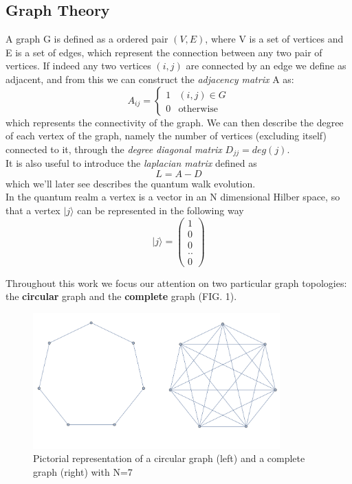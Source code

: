 \documentclass[aps,pra,reprint, onecolumn]{revtex4-2}
\begin{document}
\subsection{Graph Theory}
A graph G is defined as a ordered pair $(V,E)$, where V is a set of vertices and E is a set of edges, which represent the connection between any two pair of vertices. If indeed any two vertices $(i,j)$ are connected by an edge we define as adjacent, and from this we can construct the \textit{adjacency matrix} A as:
\begin{equation}
A_{ij} = \begin{cases} 1 & (i,j)\in G \\ 0 & \mbox{otherwise} \end{cases}
\end{equation}
which represents the connectivity of the graph. We can then describe the degree of each vertex of the graph, namely the number of vertices (excluding itself) connected to it, through the \textit{degree diagonal matrix} $D_{jj} = deg(j)$.\\
It is also useful to introduce the \textit{laplacian matrix} defined as
\begin{equation}
  L = A-D
\end{equation}
which we'll later see describes the quantum walk evolution.\\
In the quantum realm a vertex is a vector in an N dimensional Hilber space, so that a vertex $|j\rangle$ can be represented in the following way
\begin{equation}
  |j\rangle = \begin{pmatrix} 1 \\ 0 \\ 0 \\ .. \\0 \end{pmatrix}
\end{equation}

Throughout this work we focus our attention on two particular graph topologies: the \textbf{circular} graph and the \textbf{complete} graph (FIG. 1).


\begin{figure}[ht]
\includegraphics[width=9.5cm]{./figures/graph.png}%
\caption{Pictorial representation of a circular graph (left) and a complete graph (right) with N=7}
\end{figure}
\end{document}
